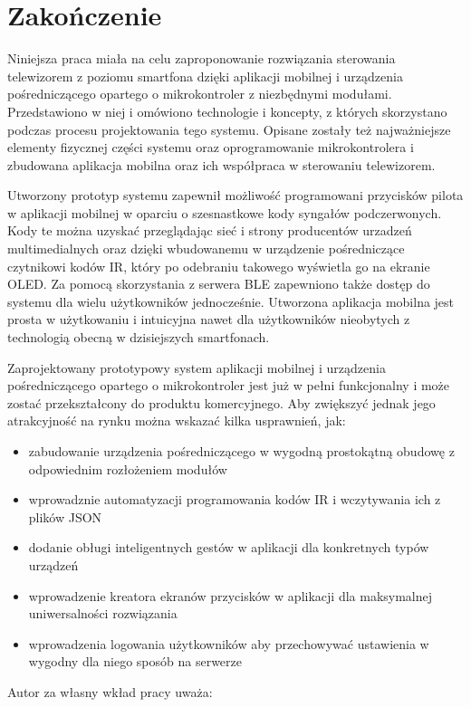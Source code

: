 \documentclass[12pt,twoside]{article}
\begin{document}
\clearpage

\section{Zakończenie}

Niniejsza praca miała na celu zaproponowanie rozwiązania sterowania telewizorem z poziomu smartfona dzięki aplikacji mobilnej i urządzenia pośredniczącego opartego o mikrokontroler z niezbędnymi modułami. Przedstawiono w niej i omówiono technologie i koncepty, z których skorzystano podczas procesu projektowania tego systemu. Opisane zostały też najważniejsze elementy fizycznej części systemu oraz oprogramowanie mikrokontrolera i zbudowana aplikacja mobilna oraz ich współpraca w sterowaniu telewizorem.

Utworzony prototyp systemu zapewnił możliwość programowani przycisków pilota w aplikacji mobilnej w oparciu o szesnastkowe kody syngałów podczerwonych. Kody te można uzyskać przeglądając sieć i strony producentów urzadzeń multimedialnych oraz dzięki wbudowanemu w urządzenie pośredniczące czytnikowi kodów IR, który po odebraniu takowego wyświetla go na ekranie OLED. Za pomocą skorzystania z serwera BLE zapewniono także dostęp do systemu dla wielu użytkowników jednocześnie. Utworzona aplikacja mobilna jest prosta w użytkowaniu i intuicyjna nawet dla użytkowników nieobytych z technologią obecną w dzisiejszych smartfonach.

Zaprojektowany prototypowy system aplikacji mobilnej i urządzenia pośredniczącego opartego o mikrokontroler jest już w pełni funkcjonalny i może zostać przekształcony do produktu komercyjnego. Aby zwiększyć jednak jego atrakcyjność na rynku można wskazać kilka usprawnień, jak:
\begin{itemize}[label=-,labelsep=0.4cm,leftmargin=0.6cm]
   \item zabudowanie urządzenia pośredniczącego w wygodną prostokątną obudowę z odpowiednim rozłożeniem modułów
   \item wprowadznie automatyzacji programowania kodów IR i wczytywania ich z plików JSON
   \item dodanie obługi inteligentnych gestów w aplikacji dla konkretnych typów urządzeń
   \item wprowadzenie kreatora ekranów przycisków w aplikacji dla maksymalnej uniwersalności rozwiązania
   \item wprowadzenia logowania użytkowników aby przechowywać ustawienia w wygodny dla niego sposób na serwerze
   
\end{itemize}

Autor za własny wkład pracy uważa: 

\clearpage
{}



\clearpage

\makesummary
\end{document}
